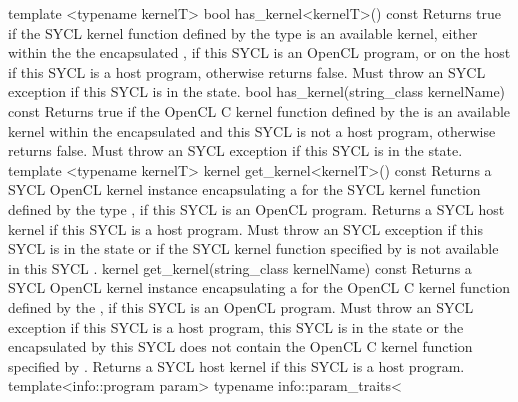   \addRowTwoL
    {template <typename kernelT>}
    {bool has_kernel<kernelT>() const}
    {
      Returns true if the SYCL kernel function defined by the type  is an available kernel, either within the the encapsulated , if this SYCL  is an OpenCL program, or on the host if this SYCL  is a host program, otherwise returns false. Must throw an  SYCL exception if this SYCL  is in the  state.
    }
  \addRow
    {bool has_kernel(string_class kernelName) const}
    {
      Returns true if the OpenCL C kernel function defined by the   is an available kernel within the encapsulated  and this SYCL  is not a host program, otherwise returns false. Must throw an  SYCL exception if this SYCL  is in the  state.
    }
  \addRowTwoL
    {template <typename kernelT>}
    {kernel get_kernel<kernelT>() const}
    {
      Returns a SYCL  OpenCL kernel instance encapsulating a  for the SYCL kernel function defined by the type , if this SYCL  is an OpenCL program. Returns a SYCL  host kernel if this SYCL  is a host program. Must throw an  SYCL exception if this SYCL  is in the  state or if the SYCL kernel function specified by  is not available in this SYCL .
    }
  \addRow
    {kernel get_kernel(string_class kernelName) const}
    {
      Returns a SYCL  OpenCL kernel instance encapsulating a  for the OpenCL C kernel function defined by the  , if this SYCL  is an OpenCL program. Must throw an  SYCL exception if this SYCL  is a host program, this SYCL  is in the  state or the  encapsulated by this SYCL  does not contain the OpenCL C kernel function specified by . Returns a SYCL  host kernel if this SYCL  is a host program.
    }
  \addRowFourL
    {template<info::program param>}
    {typename info::param_traits<}
